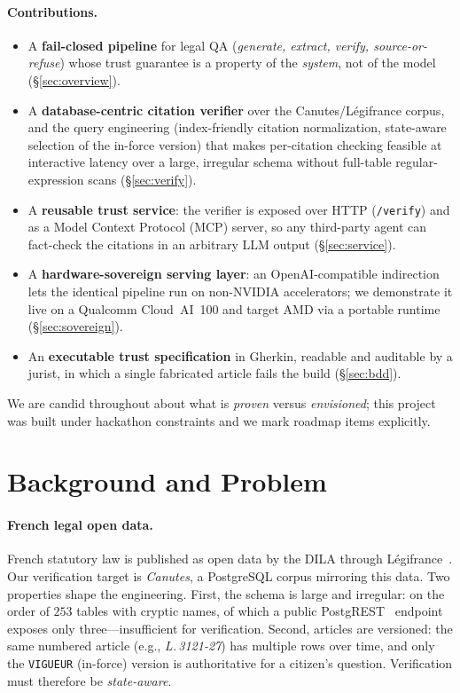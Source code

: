 \documentclass[sigconf, nonacm]{acmart}
\begin{document}
\paragraph{Contributions.}
\begin{itemize}
  \item A \textbf{fail-closed pipeline} for legal QA (\emph{generate,
  extract, verify, source-or-refuse}) whose trust guarantee is a property of
  the \emph{system}, not of the model (\S\ref{sec:overview}).
  \item A \textbf{database-centric citation verifier} over the Canutes/Légifrance
  corpus, and the query engineering (index-friendly citation normalization,
  state-aware selection of the in-force version) that makes per-citation
  checking feasible at interactive latency over a large, irregular schema
  without full-table regular-expression scans (\S\ref{sec:verify}).
  \item A \textbf{reusable trust service}: the verifier is exposed over HTTP
  (\texttt{/verify}) and as a Model Context Protocol (MCP) server, so any
  third-party agent can fact-check the citations in an arbitrary LLM output
  (\S\ref{sec:service}).
  \item A \textbf{hardware-sovereign serving layer}: an OpenAI-compatible
  indirection lets the identical pipeline run on non-NVIDIA accelerators; we
  demonstrate it live on a Qualcomm Cloud~AI~100 and target AMD via a portable
  runtime (\S\ref{sec:sovereign}).
  \item An \textbf{executable trust specification} in Gherkin, readable and
  auditable by a jurist, in which a single fabricated article fails the build
  (\S\ref{sec:bdd}).
\end{itemize}

We are candid throughout about what is \emph{proven} versus \emph{envisioned};
this project was built under hackathon constraints and we mark roadmap items
explicitly.

\section{Background and Problem}
\label{sec:background}

\paragraph{French legal open data.}
French statutory law is published as open data by the DILA through
Légifrance~\cite{legifrance}. Our verification target is \emph{Canutes}, a
PostgreSQL corpus mirroring this data. Two properties shape the engineering.
First, the schema is large and irregular: on the order of $253$ tables with
cryptic names, of which a public PostgREST~\cite{postgrest} endpoint exposes
only three---insufficient for verification. Second, articles are versioned:
the same numbered article (e.g., \emph{L.\,3121-27}) has multiple rows over
time, and only the \texttt{VIGUEUR} (in-force) version is authoritative for a
citizen's question. Verification must therefore be \emph{state-aware}.
\end{document}

